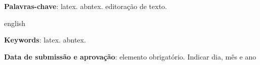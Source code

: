 \documentclass[
	article,			%
	11pt,				%
	oneside,			%
	a4paper,			%
	english,			%
	brazil,				%
	sumario=tradicional
	]{abntex2}
\begin{document}

\frenchspacing 


%
%

\maketitle





\begin{resumoumacoluna}
 \lipsum[150]
 
 \vspace{\onelineskip}
 
 \noindent
 \textbf{Palavras-chave}: latex. abntex. editoração de texto.
\end{resumoumacoluna}


\renewcommand{\resumoname}{Abstract}
\begin{resumoumacoluna}
 \begin{otherlanguage*}{english}
   \lipsum[150]

   \vspace{\onelineskip}
 
   \noindent
   \textbf{Keywords}: latex. abntex.
 \end{otherlanguage*}  
\end{resumoumacoluna}


\begin{center}\smaller
\textbf{Data de submissão e aprovação}: elemento obrigatório. Indicar dia, mês e ano
\end{center}

\textual

\end{document}
